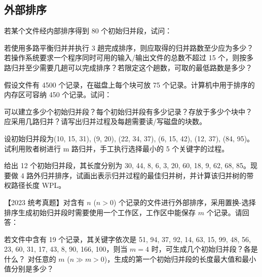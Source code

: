 \subsection{外部排序}

\begin{qitems}
    \begin{bbox}
        \qitem 若某个文件经内部排序得到 80 个初始归并段，试问：
        \begin{subqitems}
            \subqitem 若使用多路平衡归并并执行 3 趟完成排序，则应取得的归并路数至少应为多少？
            \subqitem 若操作系统要求一个程序同时可用的输入/输出文件的总数不超过 15 个，则按多路归并至少需要几趟可以完成排序？若限定这个趟数，可取的最低路数是多少？
        \end{subqitems}
    \end{bbox}
    \begin{bbox}
        \qitem 假设文件有 4500 个记录，在磁盘上每个块可放 75 个记录。计算机中用于排序的内存区可容纳 450 个记录。试问：
        \begin{subqitems}
            \subqitem 可以建立多少个初始归并段？每个初始归并段有多少记录？存放于多少个块中？
            \subqitem 应采用几路归并？请写出归并过程及每趟需要读/写磁盘的块数。
        \end{subqitems}
    \end{bbox}
    \begin{bbox}
        \qitem 设初始归并段为(10, 15, 31), (9, 20), (22, 34, 37), (6, 15, 42), (12, 37), (84, 95)。试利用败者树进行 m 路归并，手工执行选择最小的 5 个关键字的过程。
    \end{bbox}
    \begin{bbox}
        \qitem 给出 12 个初始归并段，其长度分别为 30, 44, 8, 6, 3, 20, 60, 18, 9, 62, 68, 85。现要做 4 路外归并排序，试画出表示归并过程的最佳归并树，并计算该归并树的带权路径长度 WPL。
    \end{bbox}
    \begin{bbox}
        \qitem 【2023 统考真题】对含有 $n$ ($n>0$) 个记录的文件进行外部排序，采用置换-选择排序生成初始归并段时需要使用一个工作区，工作区中能保存 $m$ 个记录。请回答：
        \begin{subqitems}
            \subqitem 若文件中含有 19 个记录，其关键字依次是 51, 94, 37, 92, 14, 63, 15, 99, 48, 56, 23, 60, 31, 17, 43, 8, 90, 166, 100，则当 $m=4$ 时，可生成几个初始归并段？各是什么？
            \subqitem 对任意的 $m$ ($n \gg m > 0$)，生成的第一个初始归并段的长度最大值和最小值分别是多少？
        \end{subqitems}
    \end{bbox}
\end{qitems} 
